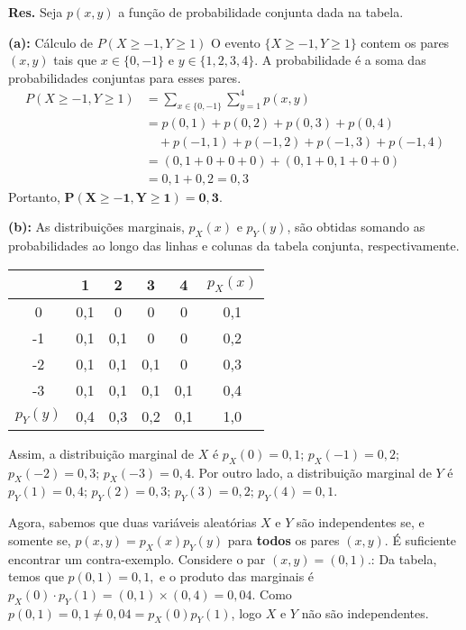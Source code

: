 {\small {\bf Res.} Seja $p(x,y)$ a função de probabilidade conjunta dada na tabela.

{\bf  (a):} Cálculo de $ P(X \geq -1, Y \geq 1) $
O evento $\{X \ge -1, Y \ge 1\}$ contem os pares $(x,y)$ tais que $x \in \{0, -1\}$ e $y \in \{1, 2, 3, 4\}$. A probabilidade é a soma das probabilidades conjuntas para esses pares.
\begin{align*}
	P(X \ge -1, Y \ge 1) &= \sum_{x \in \{0,-1\}} \sum_{y=1}^{4} p(x,y) \\
	&= p(0,1) + p(0,2) + p(0,3) + p(0,4) \\
	&\quad + p(-1,1) + p(-1,2) + p(-1,3) + p(-1,4) \\
	&= (0,1 + 0 + 0 + 0) + (0,1 + 0,1 + 0 + 0) \\
	&= 0,1 + 0,2 = 0,3
\end{align*}
Portanto, $\mathbf{P(X \geq -1, Y \geq 1) = 0,3}$.

{\bf  (b):} As distribuições marginais, $p_X(x)$ e $p_Y(y)$, são obtidas somando as probabilidades ao longo das linhas e colunas da tabela conjunta, respectivamente.
\begin{center}
	\begin{tabular}{c|cccc|c}
		\toprule
		\diagbox[height=0.7cm]{$X$}{$Y$} & 1 & 2 & 3 & 4 & $p_X(x)$ \\
		\midrule
		0 & 0,1 & 0 & 0 & 0 & 0,1 \\
		-1 & 0,1 & 0,1 & 0 & 0 & 0,2 \\
		-2 & 0,1 & 0,1 & 0,1 & 0 & 0,3 \\
		-3 & 0,1 & 0,1 & 0,1 & 0,1 & 0,4 \\
		\midrule
		$p_Y(y)$ & 0,4 & 0,3 & 0,2 & 0,1 & 1,0 \\
		\bottomrule
	\end{tabular}
\end{center}
Assim, a distribuição marginal de $X$ é
$p_X(0) = 0,1$; \quad $p_X(-1) = 0,2$; \quad $p_X(-2) = 0,3$; \quad $p_X(-3) = 0,4$.
Por outro lado, a distribuição marginal de $Y$ é
$p_Y(1) = 0,4$; \quad $p_Y(2) = 0,3$; \quad $p_Y(3) = 0,2$; \quad $p_Y(4) = 0,1$.

Agora, sabemos que duas variáveis aleatórias $X$ e $Y$ são independentes se, e somente se, $p(x,y) = p_X(x)p_Y(y)$ para \textbf{todos} os pares $(x,y)$. É suficiente encontrar um contra-exemplo.
Considere o par $(x,y) = (0,1).$: Da tabela,  temos que $p(0,1) = 0,1,$ e 
	o produto das marginais é $p_X(0) \cdot p_Y(1) = (0,1) \times (0,4) = 0,04$. Como $p(0,1) = 0,1 \neq 0,04 = p_X(0)p_Y(1)$, logo $X$ e $Y$ não são independentes.

}

